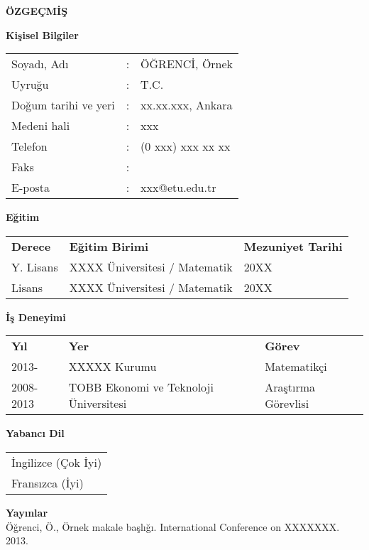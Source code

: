 \newpage
\pagestyle{plain}
\begin{center}
\textbf{ÖZGEÇMİŞ}
\end{center}
\vspace{\satbos}

\textbf{Kişisel Bilgiler}\\
\begin{tabular}{@{}lll@{}}
Soyadı, Adı & : & ÖĞRENCİ, Örnek\\
Uyruğu & : & T.C.\\
Doğum tarihi ve yeri & : & xx.xx.xxx, Ankara\\
Medeni hali & : & xxx \\
Telefon & : & (0 xxx) xxx xx xx \\
Faks & : &\\
E-posta & : & xxx@etu.edu.tr\\
\end{tabular}
\vspace{\satbos}

\textbf{Eğitim}\\
\begin{tabular}{@{}lll@{}}
\textbf{Derece} & \textbf{Eğitim Birimi} & \textbf{Mezuniyet Tarihi}\\
Y. Lisans & XXXX Üniversitesi / Matematik & 20XX\\
Lisans & XXXX Üniversitesi / Matematik & 20XX\\
\end{tabular}
\vspace{\satbos}

\textbf{İş Deneyimi}\\
\begin{tabular}{@{}lll@{}}
\textbf{Yıl} & \textbf{Yer} & \textbf{Görev}\\
2013- & XXXXX Kurumu & Matematikçi\\
2008-2013 & TOBB Ekonomi ve Teknoloji Üniversitesi & Araştırma Görevlisi\\
\end{tabular}
\vspace{\satbos}

\textbf{Yabancı Dil}\\
\begin{tabular}{@{}l@{}}
İngilizce (Çok İyi)\\
Fransızca (İyi)\\
\end{tabular}
\vspace{\satbos}

\textbf{Yayınlar}\\
Öğrenci, Ö., Örnek makale başlığı. International Conference on XXXXXXX. 2013.\\

